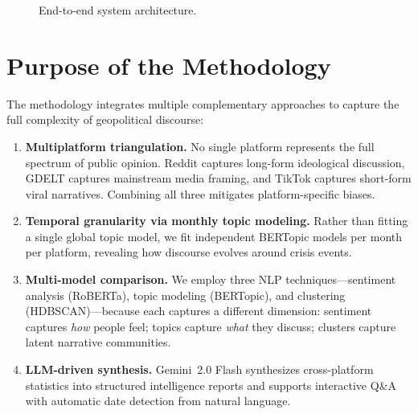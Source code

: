 \documentclass[12pt, a4paper]{article}
\begin{document}
\begin{figure}[H]
{
}
\caption{End-to-end system architecture.}
\label{fig:architecture}
\end{figure}


\section{Purpose of the Methodology}
\label{sec:purpose}

The methodology integrates multiple complementary approaches to capture the full complexity of geopolitical discourse:

\begin{enumerate}[leftmargin=*]
  \item \textbf{Multiplatform triangulation.}
        No single platform represents the full spectrum of public opinion. Reddit captures long-form ideological discussion, GDELT captures mainstream media framing, and TikTok captures short-form viral narratives. Combining all three mitigates platform-specific biases.

  \item \textbf{Temporal granularity via monthly topic modeling.}
        Rather than fitting a single global topic model, we fit independent BERTopic models per month per platform, revealing how discourse evolves around crisis events.

  \item \textbf{Multi-model comparison.}
        We employ three NLP techniques---sentiment analysis (RoBERTa), topic modeling (BERTopic), and clustering (HDBSCAN)---because each captures a different dimension: sentiment captures \emph{how} people feel; topics capture \emph{what} they discuss; clusters capture latent narrative communities.

  \item \textbf{LLM-driven synthesis.}
        Gemini~2.0 Flash synthesizes cross-platform statistics into structured intelligence reports and supports interactive Q\&A with automatic date detection from natural language.
\end{enumerate}
\end{document}
